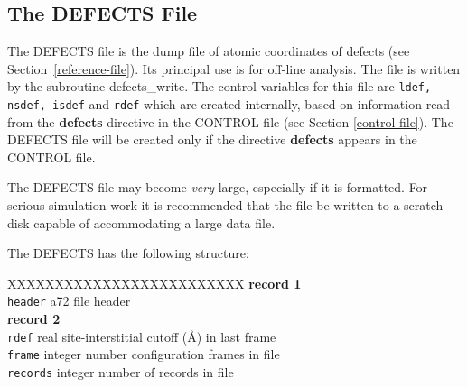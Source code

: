 \subsection{The DEFECTS File}
\label{defects-file}

The DEFECTS file is the dump file of atomic coordinates of defects
(see Section~\ref{reference-file}).  Its principal use is for
off-line analysis.  The file is written by the subroutine
{\sc defects\_write}.  The control
variables for this file are {\tt ldef, nsdef, isdef} and {\tt rdef}
which are created internally, based on information read from
the {\bf defects} directive in the CONTROL file (see Section
\ref{control-file}).  The DEFECTS file will be created only if the
directive {\bf defects} appears in the CONTROL file.

The DEFECTS file may become {\em very} large, especially if it is
formatted.  For serious simulation work it is recommended that the
file be written to a scratch disk capable of accommodating a large
data file.

The DEFECTS has the following structure:
\begin{tabbing}
X\=XXXXXXXX\=XXXXXXXXXXXXXXXX\=\kill
{\bf record 1} \\
\> {\tt header}  \> a72     \> file header \\
{\bf record 2} \\
\> {\tt rdef}    \> real    \> site-interstitial cutoff (\AA) in last frame \\
\> {\tt frame}   \> integer \> number configuration frames in file \\
\> {\tt records} \> integer \> number of records in file
\end{tabbing}

